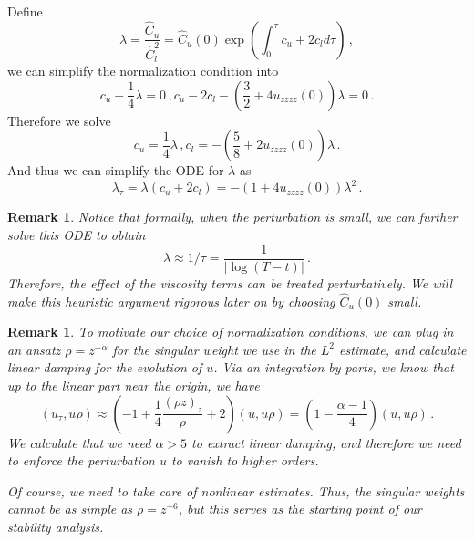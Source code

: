 \documentclass[12pt]{caltech_thesis}
\newtheorem{remark}[theorem]{Remark}
\numberwithin{equation}{section}
\begin{document}
\noindent Define $$\lambda=\frac{\hat{C}_u}{\hat{C}_l^2}=\hat{C}_u(0)\exp{(\int_0^\tau {c_u}+2c_l d\tau)}\,,$$
we can simplify the normalization condition into $${c_u}-\frac{1}{4}\lambda=0\,,{c_u}-2{c_l}-(\frac{ 3}{2}+4{u}_{zzzz}(0))\lambda=0\,.$$
Therefore we solve \begin{equation}\label{cu}{c_u}=\frac{1}{4}\lambda\,,{c_l}=-(\frac{ 5}{8}+2{u}_{zzzz}(0))\lambda\,.\end{equation}
And thus we can simplify the ODE for $\lambda$ as \begin{equation}\label{lamb}
    \lambda_\tau=\lambda(c_u+2c_l)=-(1+4{u}_{zzzz}(0))\lambda^2\,.
\end{equation}
\begin{remark}
    Notice that formally, when the perturbation is small, we can further solve this ODE to obtain $$\lambda\approx1/\tau = \frac{1}{|\log{(T-t)}|}\,.$$ Therefore, the effect of the viscosity terms can be treated perturbatively. We will make this heuristic argument rigorous later on by choosing $\hat{C}_u(0)$ small.
\end{remark}
\begin{remark}\label{rmk2}
To motivate our choice of normalization conditions, we can plug in an ansatz $\rho=z^{-\alpha}$ for the singular weight we use in the $L^2$ estimate, and calculate linear damping for the evolution of $u$. Via an integration by parts, we know that up to the linear part near the origin, we have $$(u_\tau,u\rho)\approx(-1+\frac{1}{4}\frac{(\rho z)_z}{\rho}+2)(u,u\rho)=(1-\frac{\alpha-1}{4})(u,u\rho)\,.$$ We calculate that we need $\alpha>5$ to extract linear damping, and therefore we need to enforce the perturbation $u$ to vanish to higher orders.

 Of course, we need to take care of nonlinear estimates. Thus, the singular weights cannot be as simple as $\rho=z^{-6}$, but this serves as the starting point of our stability analysis.
\end{remark}
\end{document}
